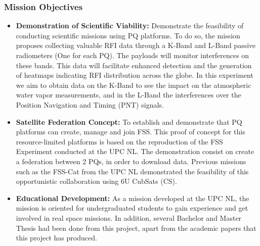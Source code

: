 \subsubsection{Mission Objectives}

\begin{itemize}
    \item \textbf{Demonstration of Scientific Viability:} Demonstrate the feasibility of 
    conducting scientific missions using PQ platforms. To do so, the mission
    proposes collecting valuable RFI data through a K-Band and L-Band passive 
    radiometers (One for each PQ). The payloads will monitor interferences on 
    these bands. This data will facilitate enhanced detection and the generation of
    heatmaps indicating RFI distribution across the globe. In this experiment we aim
    to obtain data on the K-Band to see the impact on the atmospheric water vapor 
    measurements, and in the L-Band the interferences over the Position Navigation 
    and Timing (PNT) signals.

    \item \textbf{Satellite Federation Concept:} To establish and demonstrate that 
    PQ platforms can create, manage and join FSS. This proof of concept for this resource-limited platforms is based on 
    the reproduction of the FSS Experiment conducted at the UPC NL. The 
    demonstration consist on create a federation between 2 PQs, in order 
    to download data. Previous missions such as the FSS-Cat from the UPC NL 
    demonstrated the feasibility of this opportunistic collaboration using 6U 
    CubSats (CS).

    \item \textbf{Educational Development:}  As a mission developed at the UPC NL,
     the mission is oriented for undergraduated students to gain experience and 
     get involved in real space missions. In addition, several Bachelor and Master 
     Thesis had been done from this project, apart from the academic papers that 
     this project has produced.

\end{itemize}

